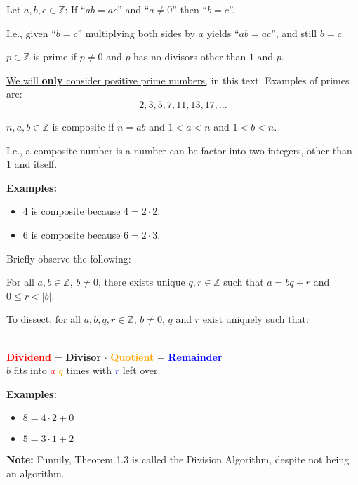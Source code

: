 \begin{Def}

    Let $a,b,c\in\mathbb{Z}$: If ``$ab=ac$'' and ``$a\neq 0$'' then ``$b=c$''.

\end{Def}

\noindent
I.e., given ``$b=c$'' multiplying both sides by $a$ yields ``$ab=ac$'', and still $b=c$.

\newpage

\begin{Def}

    $p\in\mathbb{Z}$ is prime if $p\neq 0$ and $p$ has no divisors other than $1$ and $p$.
\end{Def}
\underline{We will \textbf{only} consider positive prime numbers,} in this text. Examples of primes are:
$$2,3,5,7,11,13,17,\dots$$

\begin{Def}

    $n,a,b\in\mathbb{Z}$ is composite if $n=ab$ and $1<a<n$ and $1<b<n$.
\end{Def}
I.e., a composite number is a number can be factor into two integers, other than $1$ and itself.

\noindent
\textbf{Examples:}
\begin{itemize}
    \item $4$ is composite because $4=2\cdot2$.
    \item $6$ is composite because $6=2\cdot3$.
\end{itemize}

\noindent
Briefly observe the following:
\begin{theo}

    For all $a,b\in\mathbb{Z}$, $b\neq0$, there exists unique $q,r\in\mathbb{Z}$ such that $a=bq+r$ and $0\leq r<|b|$.
\end{theo}

\noindent
To dissect, for all $a,b,q,r\in\mathbb{Z}$, $b\neq0$, $q$ and $r$ exist uniquely such that:

\begin{center}
    \\
    \vspace*{.5em}
    \LARGE{\textcolor{red}{\textbf{Dividend}} = \textcolor{OliveGreen}{\textbf{Divisor}} $\cdot$ \textcolor{orange}{\textbf{Quotient}} + \textcolor{blue}{\textbf{Remainder}}}\\
    \Large{\textcolor{OliveGreen}{$b$} fits into \textcolor{red}{$a$} \textcolor{orange}{$q$} times with \textcolor{blue}{$r$} left over.}
\end{center}

\noindent
\textbf{Examples:}
\begin{itemize}
    \item $8=4\cdot2+0$
    \item $5=3\cdot1+2$
\end{itemize}

\begin{Note}
    \textbf{Note:} Funnily, Theorem 1.3 is called the Division Algorithm, despite not being an algorithm.
\end{Note}


